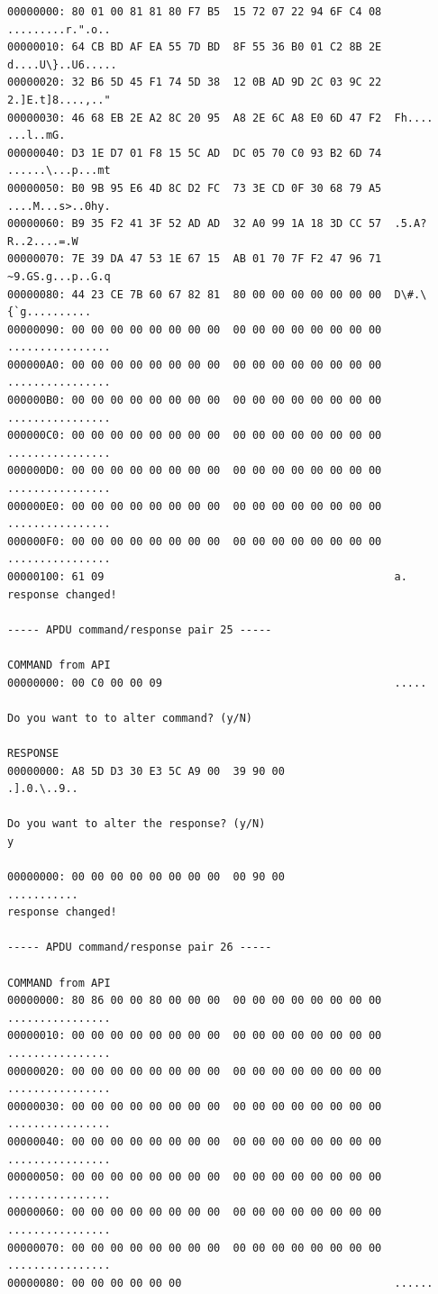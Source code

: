 \documentclass[bsc,frontabs,twoside,singlespacing,parskip,deptreport]{infthesis}     %
\begin{document}
\begin{appendices}
\begin{Verbatim}[commandchars=\\\{\}, fontsize=\small]
00000000: 80 01 00 81 81 80 F7 B5  15 72 07 22 94 6F C4 08  .........r.".o..
00000010: 64 CB BD AF EA 55 7D BD  8F 55 36 B0 01 C2 8B 2E  d....U\}..U6.....
00000020: 32 B6 5D 45 F1 74 5D 38  12 0B AD 9D 2C 03 9C 22  2.]E.t]8....,.."
00000030: 46 68 EB 2E A2 8C 20 95  A8 2E 6C A8 E0 6D 47 F2  Fh.... ...l..mG.
00000040: D3 1E D7 01 F8 15 5C AD  DC 05 70 C0 93 B2 6D 74  ......\...p...mt
00000050: B0 9B 95 E6 4D 8C D2 FC  73 3E CD 0F 30 68 79 A5  ....M...s>..0hy.
00000060: B9 35 F2 41 3F 52 AD AD  32 A0 99 1A 18 3D CC 57  .5.A?R..2....=.W
00000070: 7E 39 DA 47 53 1E 67 15  AB 01 70 7F F2 47 96 71  ~9.GS.g...p..G.q
00000080: 44 23 CE 7B 60 67 82 81  80 00 00 00 00 00 00 00  D\#.\{`g..........
00000090: 00 00 00 00 00 00 00 00  00 00 00 00 00 00 00 00  ................
000000A0: 00 00 00 00 00 00 00 00  00 00 00 00 00 00 00 00  ................
000000B0: 00 00 00 00 00 00 00 00  00 00 00 00 00 00 00 00  ................
000000C0: 00 00 00 00 00 00 00 00  00 00 00 00 00 00 00 00  ................
000000D0: 00 00 00 00 00 00 00 00  00 00 00 00 00 00 00 00  ................
000000E0: 00 00 00 00 00 00 00 00  00 00 00 00 00 00 00 00  ................
000000F0: 00 00 00 00 00 00 00 00  00 00 00 00 00 00 00 00  ................
00000100: 61 09                                             a.
response changed!

----- APDU command/response pair 25 -----

COMMAND from API
00000000: 00 C0 00 00 09                                    .....

Do you want to to alter command? (y/N)

RESPONSE
00000000: A8 5D D3 30 E3 5C A9 00  39 90 00                 .].0.\..9..

Do you want to alter the response? (y/N)
y

00000000: 00 00 00 00 00 00 00 00  00 90 00                 ...........
response changed!

----- APDU command/response pair 26 -----

COMMAND from API
00000000: 80 86 00 00 80 00 00 00  00 00 00 00 00 00 00 00  ................
00000010: 00 00 00 00 00 00 00 00  00 00 00 00 00 00 00 00  ................
00000020: 00 00 00 00 00 00 00 00  00 00 00 00 00 00 00 00  ................
00000030: 00 00 00 00 00 00 00 00  00 00 00 00 00 00 00 00  ................
00000040: 00 00 00 00 00 00 00 00  00 00 00 00 00 00 00 00  ................
00000050: 00 00 00 00 00 00 00 00  00 00 00 00 00 00 00 00  ................
00000060: 00 00 00 00 00 00 00 00  00 00 00 00 00 00 00 00  ................
00000070: 00 00 00 00 00 00 00 00  00 00 00 00 00 00 00 00  ................
00000080: 00 00 00 00 00 00                                 ......


\end{Verbatim}
\end{appendices}
\end{document}
